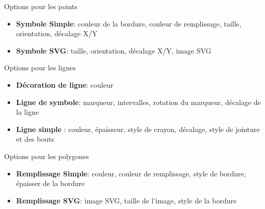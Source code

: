 \begin{description}
\item Options pour les points
\begin{itemize}[label=--]
\item \textbf{Symbole Simple}: couleur de la bordure, couleur de remplissage, taille, orientation, décalage X/Y
\item \textbf{Symbole SVG}: taille, orientation, décalage X/Y, image SVG
\end{itemize}
\item Options pour les lignes
\begin{itemize}[label=--]
\item \textbf{Décoration de ligne}: couleur
\item \textbf{Ligne de symbole}: marqueur, intervalles, rotation du marqueur, décalage de la ligne
\item \textbf{Ligne simple} : couleur, épaisseur, style de crayon, décalage, style de jointure et des bouts
\end{itemize}
\item Options pour les polygones
\begin{itemize}[label=--]
\item \textbf{Remplissage Simple}: couleur, couleur de remplissage, style de bordure, épaisser de la bordure
\item \textbf{Remplissage SVG}: image SVG, taille de l'image, style de la bordure
\end{itemize}
\end{description}


